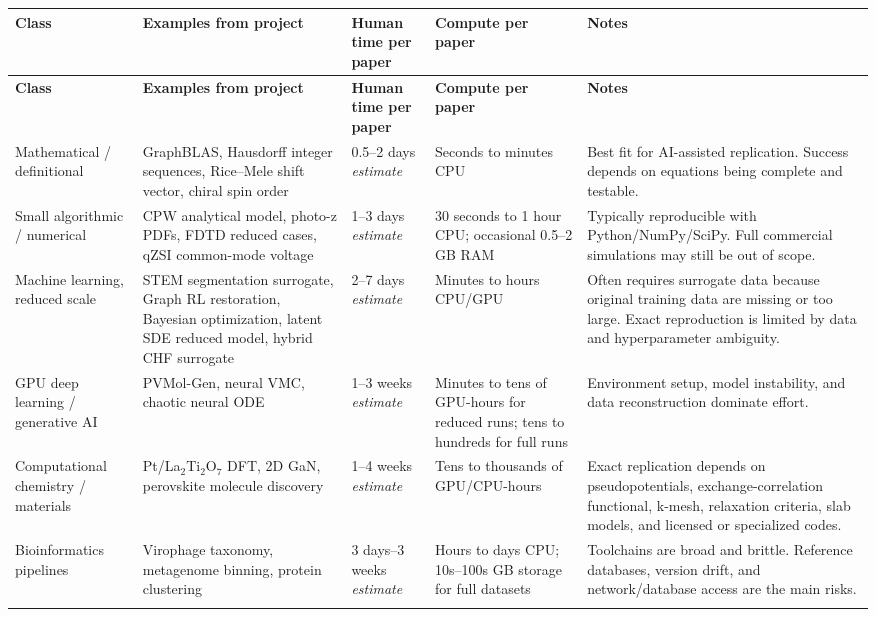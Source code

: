 \documentclass[11pt,letterpaper]{article}
\newcommand{\est}{\emph{estimate}}
\begin{document}
\begin{longtable}{p{3.0cm}p{3.6cm}p{2.4cm}p{2.8cm}p{4.4cm}}
\toprule
\textbf{Class} & \textbf{Examples from project} & \textbf{Human time per paper} & \textbf{Compute per paper} & \textbf{Notes} \\
\midrule
\endfirsthead
\toprule
\textbf{Class} & \textbf{Examples from project} & \textbf{Human time per paper} & \textbf{Compute per paper} & \textbf{Notes} \\
\midrule
\endhead
Mathematical / definitional & GraphBLAS, Hausdorff integer sequences, Rice--Mele shift vector, chiral spin order & 0.5--2 days \est{} & Seconds to minutes CPU & Best fit for AI-assisted replication. Success depends on equations being complete and testable. \\
\addlinespace
Small algorithmic / numerical & CPW analytical model, photo-z PDFs, FDTD reduced cases, qZSI common-mode voltage & 1--3 days \est{} & 30 seconds to 1 hour CPU; occasional 0.5--2 GB RAM & Typically reproducible with Python/NumPy/SciPy. Full commercial simulations may still be out of scope. \\
\addlinespace
Machine learning, reduced scale & STEM segmentation surrogate, Graph RL restoration, Bayesian optimization, latent SDE reduced model, hybrid CHF surrogate & 2--7 days \est{} & Minutes to hours CPU/GPU & Often requires surrogate data because original training data are missing or too large. Exact reproduction is limited by data and hyperparameter ambiguity. \\
\addlinespace
GPU deep learning / generative AI & PVMol-Gen, neural VMC, chaotic neural ODE & 1--3 weeks \est{} & Minutes to tens of GPU-hours for reduced runs; tens to hundreds for full runs & Environment setup, model instability, and data reconstruction dominate effort. \\
\addlinespace
Computational chemistry / materials & Pt/La$_2$Ti$_2$O$_7$ DFT, 2D GaN, perovskite molecule discovery & 1--4 weeks \est{} & Tens to thousands of GPU/CPU-hours & Exact replication depends on pseudopotentials, exchange-correlation functional, k-mesh, relaxation criteria, slab models, and licensed or specialized codes. \\
\addlinespace
Bioinformatics pipelines & Virophage taxonomy, metagenome binning, protein clustering & 3 days--3 weeks \est{} & Hours to days CPU; 10s--100s GB storage for full datasets & Toolchains are broad and brittle. Reference databases, version drift, and network/database access are the main risks. \\
\addlinespace

\end{longtable}
\end{document}
